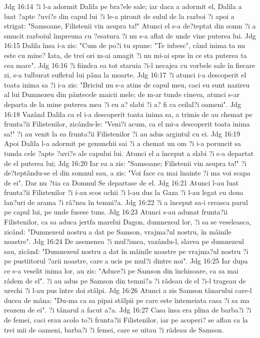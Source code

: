 Jdg 16:14  ?i l-a adormit Dalila pe bra?ele sale; iar daca a adormit el, Dalila a luat ?apte ?uvi?e din capul lui ?i le-a pironit de sulul de la razboi ?i apoi a strigat: "Samsoane, Filistenii vin asupra ta!" Atunci el s-a de?teptat din somn ?i a smucit razboiul împreuna cu ?esatura ?i nu s-a aflat de unde vine puterea lui.
Jdg 16:15  Dalila însa i-a zis: "Cum de po?i tu spune: "Te iubesc", când inima ta nu este cu mine? Iata, de trei ori m-ai amagit ?i nu mi-ai spus în ce sta puterea ta cea mare".
Jdg 16:16  ?i fiindca ea tot staruia ?i-l necajea cu vorbele sale în fiecare zi, s-a tulburat sufletul lui pâna la moarte.
Jdg 16:17  ?i atunci i-a descoperit el toata inima sa ?i i-a zis: "Briciul nu s-a atins de capul meu, caci eu sunt nazireu al lui Dumnezeu din pântecele maicii mele; de m-ar tunde cineva, atunci s-ar departa de la mine puterea mea ?i eu a? slabi ?i a? fi ca ceilal?i oameni".
Jdg 16:18  Vazând Dalila ca el i-a descoperit toata inima sa, a trimis de au chemat pe frunta?ii Filistenilor, zicându-le: "Veni?i acum, ca el mi-a descoperit toata inima sa!" ?i au venit la ea frunta?ii Filistenilor ?i au adus argintul cu ei.
Jdg 16:19  Apoi Dalila l-a adormit pe genunchii sai ?i a chemat un om ?i i-a poruncit sa tunda cele ?apte ?uvi?e ale capului lui. Atunci el a început a slabi ?i s-a departat de el puterea lui;
Jdg 16:20  Iar ea a zis: "Samsoane; Filistenii vin asupra ta!" ?i de?teptându-se el din somnul sau, a zis: "Voi face ca mai înainte ?i ma voi scapa de ei". Dar nu ?tia ca Domnul Se departase de el.
Jdg 16:21  Atunci l-au luat frunta?ii Filistenilor ?i i-au scos ochii ?i l-au dus la Gaza ?i l-au legat cu doua lan?uri de arama ?i râ?nea în temni?a.
Jdg 16:22  ?i a început sa-i creasca parul pe capul lui, pe unde fusese tuns.
Jdg 16:23  Atunci s-au adunat frunta?ii Filistenilor, ca sa aduca jertfa marelui Dagon, dumnezeul lor, ?i sa se veseleasca, zicând: "Dumnezeul nostru a dat pe Samson, vrajma?ul nostru, în mâinile noastre".
Jdg 16:24  De asemenea ?i mul?imea, vazându-l, slavea pe dumnezeul sau, zicând: "Dumnezeul nostru a dat în mâinile noastre pe vrajma?ul nostru ?i pe pustiitorul ?arii noastre, care a ucis pe mul?i dintre noi".
Jdg 16:25  Iar dupa ce s-a veselit inima lor, au zis: "Aduce?i pe Samson din închisoare, ca sa mai râdem de el". ?i au adus pe Samson din temni?a ?i râdeau de el ?i-l trageau de urechi ?i l-au pus între doi stâlpi.
Jdg 16:26  Atunci a zis Samson tânarului care-l ducea de mâna: "Du-ma ca sa pipai stâlpii pe care este întemeiata casa ?i sa ma reazem de ei". ?i tânarul a facut a?a.
Jdg 16:27  Casa însa era plina de barba?i ?i de femei, caci erau acolo to?i frunta?ii Filistenilor, iar pe acoperi? se aflau ca la trei mii de oameni, barba?i ?i femei, care se uitau ?i râdeau de Samson.
